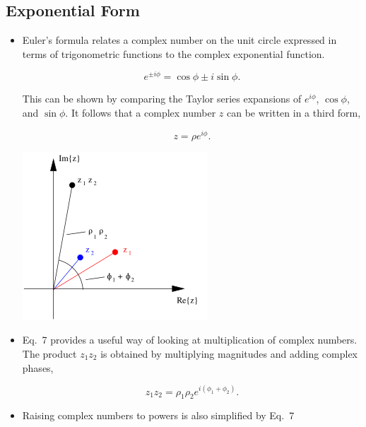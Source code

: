 \documentclass[12pt]{article}
\begin{document}
\subsection*{Exponential Form}
\begin{itemize}
\item Euler's formula relates a complex number on the unit circle
  expressed in terms of trigonometric functions to the complex
  exponential function.

  \begin{equation}
    \label{eq:Euler}
    e^{\pm i\phi} = \cos \phi \pm i \sin \phi.
  \end{equation}

  \noindent
  This can be shown by comparing the Taylor series expansions of
  $e^{i\phi}$, $\cos \phi$, and $\sin \phi$. It follows that a complex
  number $z$ can be written in a third form,

  \begin{equation}
    \label{eq:zExp}
    z = \rho e^{i\phi}.
  \end{equation}

  \begin{center}
    \includegraphics{complexMult.png}
  \end{center}

\item Eq.~7%
  provides a useful way of looking at
  multiplication of complex numbers. The product $z_1 z_2$ is 
  obtained by multiplying magnitudes and adding complex phases,

  \begin{equation}
    z_1 z_2 = \rho_1 \rho_2 e^{i(\phi_1 + \phi_2)}.
  \end{equation}

\item Raising complex numbers to powers is also simplified by
  Eq.~7%


\end{itemize}
\end{document}
